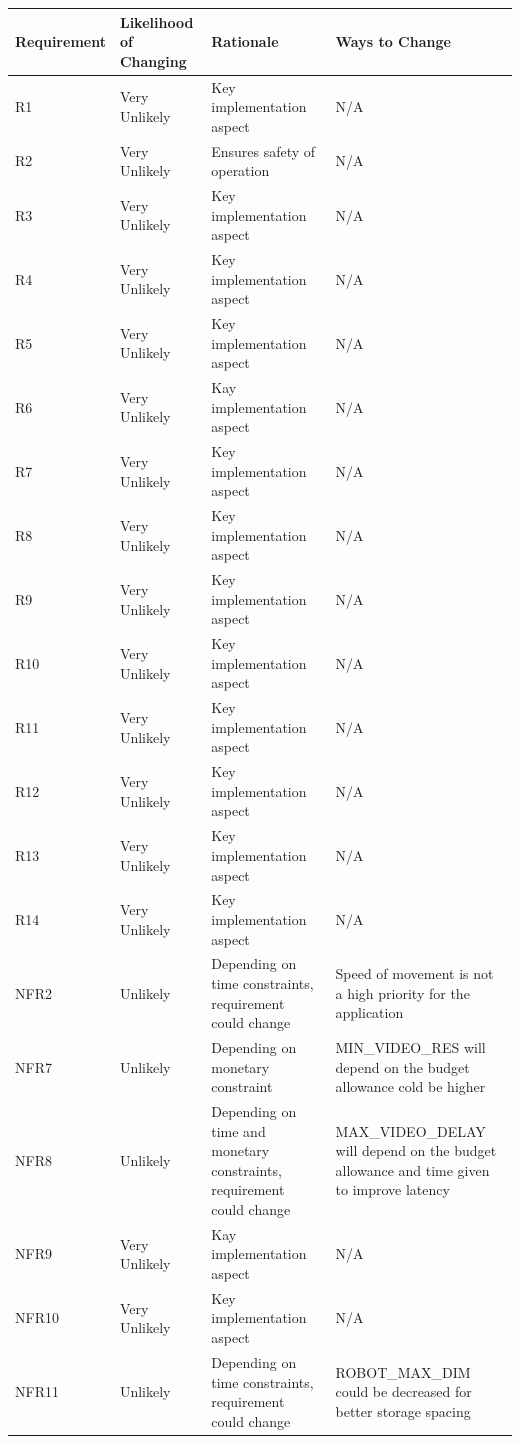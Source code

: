 \documentclass[12pt]{article}
\begin{document}
\begin{longtable}{ | p{2.3cm} | p{3.0cm} | p{4cm} | p{4cm} |}
\hline
Requirement & Likelihood of Changing & Rationale & Ways to Change \\
\hline
R1 & Very Unlikely & Key implementation aspect & N/A \\
\hline
R2 & Very Unlikely & Ensures safety of operation & N/A \\ 
\hline
R3 & Very Unlikely & Key implementation aspect & N/A \\
\hline
R4 & Very Unlikely & Key implementation aspect & N/A \\
\hline
R5 & Very Unlikely & Key implementation aspect & N/A \\
\hline
R6 & Very Unlikely & Kay implementation aspect & N/A \\
\hline
R7 & Very Unlikely & Key implementation aspect & N/A \\
\hline
R8 & Very Unlikely & Key implementation aspect & N/A \\
\hline
R9 & Very Unlikely & Key implementation aspect & N/A \\
\hline
R10 & Very Unlikely & Key implementation aspect & N/A \\
\hline
R11 & Very Unlikely & Key implementation aspect & N/A \\
\hline
R12 & Very Unlikely & Key implementation aspect & N/A \\
\hline
R13 & Very Unlikely & Key implementation aspect & N/A \\
\hline
R14 & Very Unlikely & Key implementation aspect & N/A \\
\hline
NFR2 & Unlikely & Depending on time constraints, requirement could change & Speed of movement is not a high priority  for the application \\
\hline
NFR7 & Unlikely & Depending on monetary constraint & MIN\_VIDEO\_RES will depend on the budget allowance cold be higher \\
\hline
NFR8 & Unlikely & Depending on time and monetary constraints, requirement could change & MAX\_VIDEO\_DELAY will depend on the budget allowance and time given to improve latency \\
\hline
NFR9 & Very Unlikely & Kay implementation aspect & N/A \\
\hline
NFR10 & Very Unlikely & Key implementation aspect & N/A \\
\hline
NFR11 & Unlikely & Depending on time constraints, requirement could change & ROBOT\_MAX\_DIM could be decreased for better storage spacing \\

\end{longtable}
\end{document}

